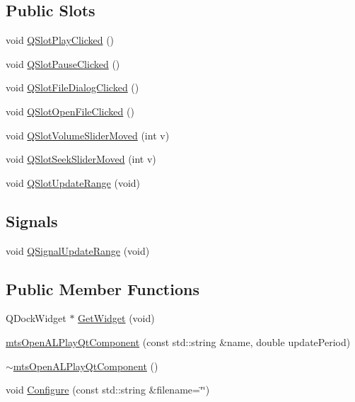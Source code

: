 \subsection*{Public Slots}
\begin{DoxyCompactItemize}
\item 
void \hyperlink{classmts_open_a_l_play_qt_component_a9a25f6dd1813665a5a60f249f596e88f}{Q\-Slot\-Play\-Clicked} ()
\item 
void \hyperlink{classmts_open_a_l_play_qt_component_ac126ec66be8ed659c39d2223931a74ce}{Q\-Slot\-Pause\-Clicked} ()
\item 
void \hyperlink{classmts_open_a_l_play_qt_component_a196711ea4b1b44b244c8066c8745cecc}{Q\-Slot\-File\-Dialog\-Clicked} ()
\item 
void \hyperlink{classmts_open_a_l_play_qt_component_a573df09363219c19e4379e3c7d797002}{Q\-Slot\-Open\-File\-Clicked} ()
\item 
void \hyperlink{classmts_open_a_l_play_qt_component_acc3b3c342da250ef5c142c927ce65fce}{Q\-Slot\-Volume\-Slider\-Moved} (int v)
\item 
void \hyperlink{classmts_open_a_l_play_qt_component_ae254af009b2c63c13f65481cdacc9a5a}{Q\-Slot\-Seek\-Slider\-Moved} (int v)
\item 
void \hyperlink{classmts_open_a_l_play_qt_component_a429175bcd456b5c0cbc5b6e65f8cb6dd}{Q\-Slot\-Update\-Range} (void)
\end{DoxyCompactItemize}
\subsection*{Signals}
\begin{DoxyCompactItemize}
\item 
void \hyperlink{classmts_open_a_l_play_qt_component_a88893d1a991cd9057aec60251f24e7c9}{Q\-Signal\-Update\-Range} (void)
\end{DoxyCompactItemize}
\subsection*{Public Member Functions}
\begin{DoxyCompactItemize}
\item 
Q\-Dock\-Widget $\ast$ \hyperlink{classmts_open_a_l_play_qt_component_a7e2e578a40881a0f30a6bbcae7f3f7a2}{Get\-Widget} (void)
\item 
\hyperlink{classmts_open_a_l_play_qt_component_a6ea7c1ad8d2983152631f672426fbf45}{mts\-Open\-A\-L\-Play\-Qt\-Component} (const std\-::string \&name, double update\-Period)
\item 
\hyperlink{classmts_open_a_l_play_qt_component_a819a527bda53377d22c3baa6169d13cb}{$\sim$mts\-Open\-A\-L\-Play\-Qt\-Component} ()
\item 
void \hyperlink{classmts_open_a_l_play_qt_component_ad660372ea570ac8ea5585a897f5f6c74}{Configure} (const std\-::string \&filename=\char`\"{}\char`\"{})
\end{DoxyCompactItemize}
